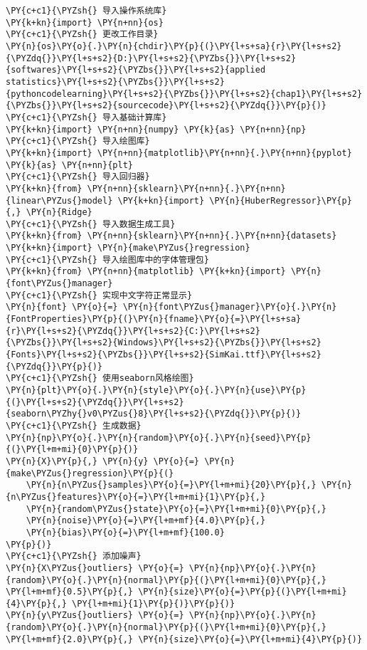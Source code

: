 \begin{Verbatim}[commandchars=\\\{\}]
\PY{c+c1}{\PYZsh{} 导入操作系统库}
\PY{k+kn}{import} \PY{n+nn}{os}
\PY{c+c1}{\PYZsh{} 更改工作目录}
\PY{n}{os}\PY{o}{.}\PY{n}{chdir}\PY{p}{(}\PY{l+s+sa}{r}\PY{l+s+s2}{\PYZdq{}}\PY{l+s+s2}{D:}\PY{l+s+s2}{\PYZbs{}}\PY{l+s+s2}{softwares}\PY{l+s+s2}{\PYZbs{}}\PY{l+s+s2}{applied statistics}\PY{l+s+s2}{\PYZbs{}}\PY{l+s+s2}{pythoncodelearning}\PY{l+s+s2}{\PYZbs{}}\PY{l+s+s2}{chap1}\PY{l+s+s2}{\PYZbs{}}\PY{l+s+s2}{sourcecode}\PY{l+s+s2}{\PYZdq{}}\PY{p}{)}
\PY{c+c1}{\PYZsh{} 导入基础计算库}
\PY{k+kn}{import} \PY{n+nn}{numpy} \PY{k}{as} \PY{n+nn}{np}
\PY{c+c1}{\PYZsh{} 导入绘图库}
\PY{k+kn}{import} \PY{n+nn}{matplotlib}\PY{n+nn}{.}\PY{n+nn}{pyplot} \PY{k}{as} \PY{n+nn}{plt}
\PY{c+c1}{\PYZsh{} 导入回归器}
\PY{k+kn}{from} \PY{n+nn}{sklearn}\PY{n+nn}{.}\PY{n+nn}{linear\PYZus{}model} \PY{k+kn}{import} \PY{n}{HuberRegressor}\PY{p}{,} \PY{n}{Ridge}
\PY{c+c1}{\PYZsh{} 导入数据生成工具}
\PY{k+kn}{from} \PY{n+nn}{sklearn}\PY{n+nn}{.}\PY{n+nn}{datasets} \PY{k+kn}{import} \PY{n}{make\PYZus{}regression}
\PY{c+c1}{\PYZsh{} 导入绘图库中的字体管理包}
\PY{k+kn}{from} \PY{n+nn}{matplotlib} \PY{k+kn}{import} \PY{n}{font\PYZus{}manager}
\PY{c+c1}{\PYZsh{} 实现中文字符正常显示}
\PY{n}{font} \PY{o}{=} \PY{n}{font\PYZus{}manager}\PY{o}{.}\PY{n}{FontProperties}\PY{p}{(}\PY{n}{fname}\PY{o}{=}\PY{l+s+sa}{r}\PY{l+s+s2}{\PYZdq{}}\PY{l+s+s2}{C:}\PY{l+s+s2}{\PYZbs{}}\PY{l+s+s2}{Windows}\PY{l+s+s2}{\PYZbs{}}\PY{l+s+s2}{Fonts}\PY{l+s+s2}{\PYZbs{}}\PY{l+s+s2}{SimKai.ttf}\PY{l+s+s2}{\PYZdq{}}\PY{p}{)}
\PY{c+c1}{\PYZsh{} 使用seaborn风格绘图}
\PY{n}{plt}\PY{o}{.}\PY{n}{style}\PY{o}{.}\PY{n}{use}\PY{p}{(}\PY{l+s+s2}{\PYZdq{}}\PY{l+s+s2}{seaborn\PYZhy{}v0\PYZus{}8}\PY{l+s+s2}{\PYZdq{}}\PY{p}{)}
\PY{c+c1}{\PYZsh{} 生成数据}
\PY{n}{np}\PY{o}{.}\PY{n}{random}\PY{o}{.}\PY{n}{seed}\PY{p}{(}\PY{l+m+mi}{0}\PY{p}{)}
\PY{n}{X}\PY{p}{,} \PY{n}{y} \PY{o}{=} \PY{n}{make\PYZus{}regression}\PY{p}{(}
    \PY{n}{n\PYZus{}samples}\PY{o}{=}\PY{l+m+mi}{20}\PY{p}{,} \PY{n}{n\PYZus{}features}\PY{o}{=}\PY{l+m+mi}{1}\PY{p}{,} 
    \PY{n}{random\PYZus{}state}\PY{o}{=}\PY{l+m+mi}{0}\PY{p}{,} 
    \PY{n}{noise}\PY{o}{=}\PY{l+m+mf}{4.0}\PY{p}{,} 
    \PY{n}{bias}\PY{o}{=}\PY{l+m+mf}{100.0}
\PY{p}{)}
\PY{c+c1}{\PYZsh{} 添加噪声}
\PY{n}{X\PYZus{}outliers} \PY{o}{=} \PY{n}{np}\PY{o}{.}\PY{n}{random}\PY{o}{.}\PY{n}{normal}\PY{p}{(}\PY{l+m+mi}{0}\PY{p}{,} \PY{l+m+mf}{0.5}\PY{p}{,} \PY{n}{size}\PY{o}{=}\PY{p}{(}\PY{l+m+mi}{4}\PY{p}{,} \PY{l+m+mi}{1}\PY{p}{)}\PY{p}{)}
\PY{n}{y\PYZus{}outliers} \PY{o}{=} \PY{n}{np}\PY{o}{.}\PY{n}{random}\PY{o}{.}\PY{n}{normal}\PY{p}{(}\PY{l+m+mi}{0}\PY{p}{,} \PY{l+m+mf}{2.0}\PY{p}{,} \PY{n}{size}\PY{o}{=}\PY{l+m+mi}{4}\PY{p}{)}

\end{Verbatim}
